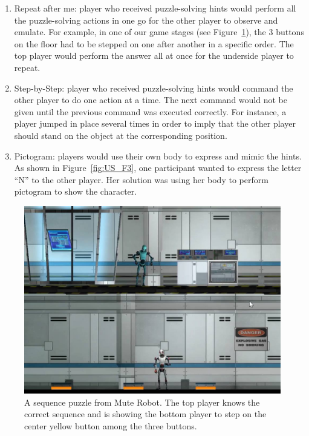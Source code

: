 \begin{enumerate}
  \item Repeat after me: player who received puzzle-solving hints would perform all the puzzle-solving actions in one go for the other player to observe and emulate. For example, in one of our game stages (see Figure~\ref{fig:US_F2}), the 3 buttons on the floor had to be stepped on one after another in a specific order. The top player would perform the answer all at once for the underside player to repeat. 
 
  \item Step-by-Step: player who received puzzle-solving hints would command the other player to do one action at a time. The next command would not be given until the previous command was executed correctly. For instance, a player jumped in place several times in order to imply that the other player should stand on the object at the corresponding position.
                                  
  \item Pictogram: players would use their own body to express and mimic the hints. As shown in Figure~\ref{fig:US_F3}, one participant wanted to express the letter “N” to the other player. Her solution was using her body to perform pictogram to show the character.
\end{enumerate}

\begin{figure}[!h]
\centering
\includegraphics[width=0.7\columnwidth]{Figures/US_F2.jpg}
\caption{A sequence puzzle from Mute Robot. The top player knows the correct sequence and is showing the bottom player to step on the center yellow button among the three buttons.}
\label{fig:US_F2}
\end{figure}

